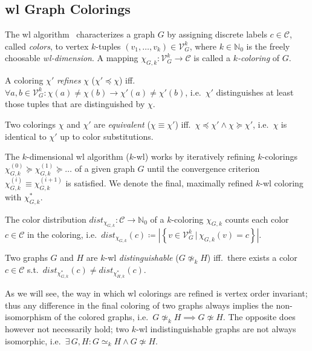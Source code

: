\subsection{\acl{wl} Graph Colorings}%
\label{sec:related:character:wl}

The \acf{wl} algorithm~\cite{Weisfeiler1968}\cite{Cai1992} characterizes a graph $G$ by assigning discrete labels $c \in \mathcal{C}$, called \textit{colors}, to vertex $k$-tuples $(v_1, \dots, v_k) \in \mathcal{V}_G^k$, where $k \in \mathbb{N}_0$ is the freely choosable \textit{\ac{wl}-dimension}.
A mapping $\chi_{G, k}: \mathcal{V}_G^k \to \mathcal{C}$ is called a \textit{$k$-coloring} of $G$.
\begin{defn}
	A coloring $\chi'$ \textit{refines} $\chi$ ($\chi' \preceq \chi$) iff.\ $\forall a, b \in \mathcal{V}_G^k: \chi(a) \neq \chi(b) \rightarrow \chi'(a) \neq \chi'(b)$, i.e.\ $\chi'$ distinguishes at least those tuples that are distinguished by $\chi$.
\end{defn}
\begin{defn}
	Two colorings $\chi$ and $\chi'$ are \textit{equivalent} ($\chi \equiv \chi'$) iff.\ $\chi \preceq \chi' \land \chi \succeq \chi'$, i.e.\ $\chi$ is identical to $\chi'$ up to color substitutions.
\end{defn}
The $k$-dimensional \ac{wl} algorithm ($k$-\acs{wl}) works by iteratively refining $k$-colorings $\chi_{G, k}^{(0)} \succeq \chi_{G, k}^{(1)} \succeq \dots$ of a given graph $G$ until the convergence criterion $\chi_{G, k}^{(i)} \equiv \chi_{G, k}^{(i+1)}$ is satisfied.
We denote the final, maximally refined $k$-\acs{wl} coloring with $\chi^{*}_{G, k}$.
\begin{defn}
	The color distribution $\mathit{dist}_{\chi_{G, k}}: \mathcal{C} \to \mathbb{N}_0$ of a $k$-coloring $\chi_{G, k}$ counts each color $c \in \mathcal{C}$ in the coloring, i.e.\ $\mathit{dist}_{\chi_{G, k}}(c) \coloneqq \left|\left\{ v \in \mathcal{V}_G^k\, |\, \chi_{G, k}(v) = c \right\}\right|$. %
\end{defn}
\begin{defn}\label{defn:related:wl-distinguishable}
	Two graphs $G$ and $H$ are $k$-\acs{wl} \textit{distinguishable} ($G \mathrel{{\not\simeq}_k} H$) iff.\ there exists a color $c \in \mathcal{C}$ s.t.\ $\mathit{dist}_{\chi^{*}_{G, k}}(c) \neq \mathit{dist}_{\chi^{*}_{H, k}}(c)$.
\end{defn}
As we will see, the way in which \ac{wl} colorings are refined is vertex order invariant;
thus any difference in the final coloring of two graphs always implies the non-isomorphism of the colored graphs, i.e.\ $G \mathrel{{\not\simeq}_k} H \implies G \not\simeq H$.
The opposite does however not necessarily hold;
two $k$-\acs{wl} indistinguishable graphs are not always isomorphic, i.e.\ $\exists\, G, H: G \mathrel{{\simeq}_k} H \land G \not\simeq H$. %

